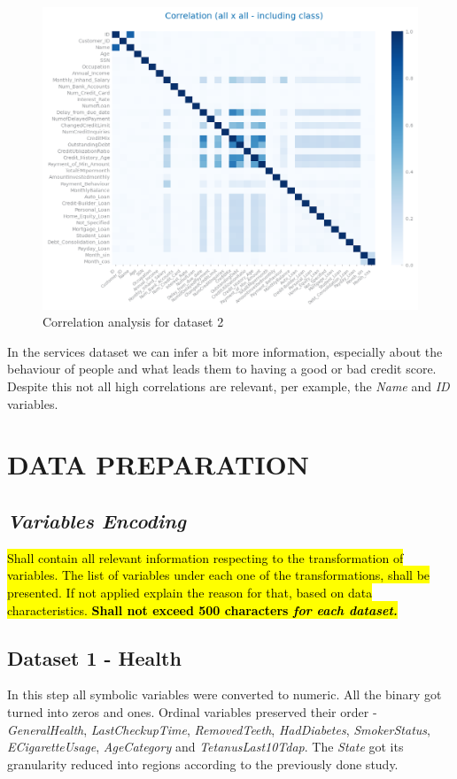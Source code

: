 \documentclass[10pt]{extarticle}
\newcommand{\ctext}[3][RGB]{%
  \begingroup
  \definecolor{hlcolor}{#1}{#2}\sethlcolor{hlcolor}%
  \hl{#3}%
  \endgroup
}
\begin{document}
\begin{figure}[H]
\centering\includegraphics[scale=0.6]{images/dataset2/data_profiling/Credit_Score_correlation_analysis.png}
\caption{Correlation analysis for dataset 2}
\end{figure}
In the services dataset we can infer a bit more information, especially about the behaviour of people and what leads them to having
a good or bad credit score. Despite this not all high correlations are relevant, per example, the \textit{Name} and \textit{ID}
variables.

\section{DATA PREPARATION}

\subsection*{\textit{Variables Encoding}}
\ctext[RGB]{190,190,190}{Shall contain all relevant information respecting to the transformation of variables. The list of variables under each one of the transformations, shall be presented. If not applied explain the reason for that, based on data characteristics.  \textbf{Shall not exceed 500 characters \textit{for each dataset.}}}

\subsection*{Dataset 1 - Health}
In this step all symbolic variables were converted to numeric. All the binary got turned into zeros and ones.
Ordinal variables preserved their order - \textit{GeneralHealth}, \textit{LastCheckupTime}, \textit{RemovedTeeth},
\textit{HadDiabetes}, \textit{SmokerStatus}, \textit{ECigaretteUsage}, \textit{AgeCategory} and 
\textit{TetanusLast10Tdap}. The \textit{State} got its granularity reduced into regions according to the previously done study.
\end{document}
